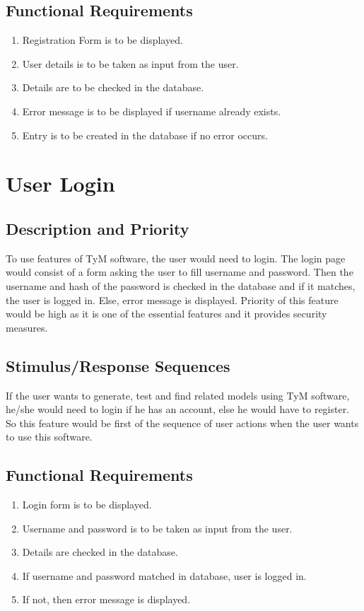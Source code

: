 \documentclass[12pt]{scrreprt}
\begin{document}
\subsection{Functional Requirements}
\begin{enumerate}
\item Registration Form is to be displayed.
\item User details is to be taken as input from the user.
\item Details are to be checked in the database.
\item Error message is to be displayed if username already exists.
\item Entry is to be created in the database if no error occurs.
\end{enumerate}

\section{User Login}

\subsection{Description and Priority}
To use features of TyM software, the user would need to login. The login page would consist of a form asking the user to fill username and password. Then the username and hash of the password is checked in the database and if it matches, the user is logged in. Else, error message is displayed. Priority of this feature would be high as it is one of the essential features and it provides security measures.

\subsection{Stimulus/Response Sequences}
If the user wants to generate, test and find related models using TyM software, he/she would need to login if he has an account, else he would have to register. So this feature would be first of the sequence of user actions when the user wants to use this software.  

\subsection{Functional Requirements}
\begin{enumerate}
\item Login form is to be displayed.
\item Username and password is to be taken as input from the user.
\item Details are checked in the database.
\item If username and password matched in database, user is logged in.
\item If not, then error message is displayed.
\end{enumerate}
\end{document}
